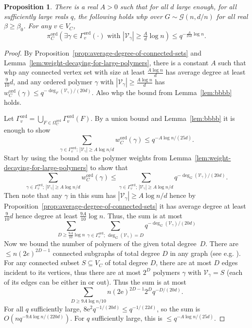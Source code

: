 \documentclass[11pt]{article}
\theoremstyle{plain}
\newtheorem{proposition}[theorem]{Proposition}
\newcommand{\G}{\mathcal{G}}
\newcommand{\emm}{\mathrm{e}}
\newcommand{\V}{\mathcal{V}}
\newcommand{\Vin}{\V_\gamma}
\newcommand{\1}{\mathbb{1}}
\newcommand{\ord}{\mathrm{ord}}
\begin{document}
\begin{proposition}\label{prop:no-large-ordered-polymer}
    There is a real  \(A > 0\) such that for all \(d\) large enough, for all sufficiently large reals $q$, the following holds whp over \(G\sim\G(n,d/n)\) for all real \(\beta \geq \beta_0\). For any \(v\in V_C\),
    \[
    \pi^\ord_C(\exists \gamma\in\Gamma^\ord_v(\cdot) \text{ with } |\Vin|\geq \tfrac{A}{d}\log n) \leq q^{-\frac{A}{25d}\log n}.
    \]
\end{proposition}
\begin{proof}
By Proposition~\ref{prop:average-degree-of-connected-sets} and Lemma~\ref{lem:weight-decaying-for-large-polymers}, there is a constant \(A\) such that whp any connected vertex set with size at least \(\tfrac{A\log n}{d}\) has average degree at least \(\tfrac{9}{10} d\), and any ordered polymer \(\gamma\) with \(|\V_\gamma|\geq\tfrac{A\log n}{d}\) has 
$w_C^{\ord}(\gamma) \leq  q^{-\deg_F(\V_\gamma)/(20d)}$. Also whp the bound from  Lemma~\ref{lem:bbbb} holds.

Let $\Gamma_v^\ord=\bigcup_{F\in\Omega_C^\ord}\Gamma_v^\ord(F)$. By a union bound and Lemma~\ref{lem:bbbb} it is enough to show   
\[        \sum_{\gamma\in \Gamma_v^\ord;\,  |\Vin|\geq A\log n/d} w^\ord_C(\gamma) \leq q^{-A\log n/(25d)}.
\]
Start by using the bound on the polymer weights from Lemma~\ref{lem:weight-decaying-for-large-polymers}   to show that 
\[
 \sum_{\gamma\in \Gamma_v^\ord;\,  |\Vin|\geq A\log n/d} w^\ord_C(\gamma) \leq
\sum_{\gamma\in \Gamma_v^\ord;\,  |\Vin|\geq A\log n/d} q^{-\deg_G(\V_\gamma)/(20d)}.\]
Then note that any $\gamma$ in this sum
has $|\Vin|\geq A\log n/d$ hence
by Proposition~\ref{prop:average-degree-of-connected-sets} it has average degree at least
$\tfrac{9}{10} d$ hence degree at least $\tfrac{9A}{10} \log n$.
Thus, the sum is at most 
    \[ 
    \sum_{D\geq \frac{9A}{10}\log n}\sum_{\gamma\in \Gamma_v^\ord;\,  \deg_G(\Vin)= D} q^{-\deg_G(\V_\gamma)/(20d)} 
    \]
    Now we bound the number of polymers of the given total degree~$D$. There are \(\leq n(2e)^{2D-1}\) connected subgraphs of total degree \(D\) in any graph (see e.g. \cite[Lemma 6]{GALANIS2022104894}). For any connected subset \(S\subseteq V_C\) of total degree \(D\), there are at most \(D\) edges incident to its vertices, thus there are at most \(2^D\) polymers \(\gamma\) with \(\Vin = S\) (each of its edges can be either in or out). Thus the sum is at most
    \[
    \sum_{D\geq 9A\log n/10} n(2\emm)^{2D-1} 2^D q^{-D / (20d)}.
    \]
    For all \(q\) sufficiently large, \(8\emm^2 q^{-1/(20d)}\leq q^{-1/(22d)}\), so the sum is \(O(nq^{-9A\log n/(220d)})\). For \(q\) sufficiently large, this is \(\leq q^{-A\log n/(25d)}\).
\end{proof}
\end{document}
